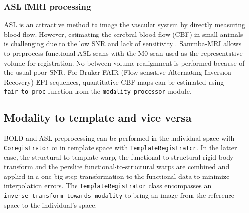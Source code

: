 \documentclass[utf8, a4paper, final, crop]{frontiersSCNS}
\newcommand{\pythoninline}[1]{\texttt{#1}}
\begin{document}
%
\subsubsection{ASL fMRI processing}

ASL is an attractive method 
to image the vascular system by directly measuring blood flow.
However, estimating the cerebral blood flow (CBF) in small animals is challenging due 
to the low SNR and lack of sensitivity \citep{kober2008experimental}.
Sammba-MRI allows to preprocess functional ASL scans with the M0 scan used 
as the representative volume for registration. 
No %
between volume realignment is performed because of the usual poor SNR.
For Bruker-FAIR (Flow-sensitive Alternating Inversion Recovery) EPI sequences,
quantitative   CBF   maps can be estimated using \pythoninline{fair_to_proc} 
function from the \pythoninline{modality_processor} module.

\subsection{Modality to template and vice versa}

BOLD and ASL preprocessing can be performed in the individual space with
\pythoninline{Coregistrator} or in template space with \pythoninline{TemplateRegistrator}.
In the latter case, the structural-to-template warp, the functional-to-structural 
rigid body transform and the perslice functional-to-structural warps are %
combined 
 and applied in a one-big-step transformation
to the functional data to minimize interpolation errors.
The \pythoninline{TemplateRegistrator} class encompasses an 
\pythoninline{inverse_transform_towards_modality}
 to bring an image from the reference space to the individual's space.


\end{document}
